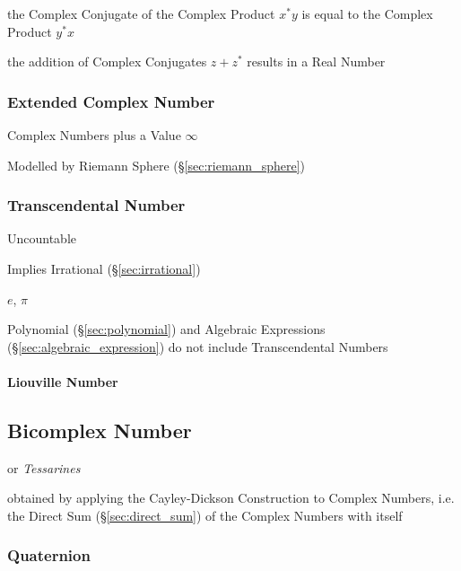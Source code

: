 the Complex Conjugate of the Complex Product $x^*y$ is equal to the Complex
Product $y^*x$

the addition of Complex Conjugates $z + z^*$ results in a Real Number



\subsubsection{Extended Complex Number}\label{sec:extended_complex}

Complex Numbers plus a Value $\infty$

Modelled by Riemann Sphere (\S\ref{sec:riemann_sphere})



\subsubsection{Transcendental Number}\label{sec:transcendental}

Uncountable

Implies Irrational (\S\ref{sec:irrational})

$e$, $\pi$

Polynomial (\S\ref{sec:polynomial}) and Algebraic Expressions
(\S\ref{sec:algebraic_expression}) do not include Transcendental Numbers



\paragraph{Liouville Number}\label{sec:liouville_number}\hfill



\subsection{Bicomplex Number}\label{sec:bicomplex_number}

or \emph{Tessarines}

obtained by applying the Cayley-Dickson Construction to Complex Numbers, i.e.
the Direct Sum (\S\ref{sec:direct_sum}) of the Complex Numbers with itself



\subsubsection{Quaternion}\label{sec:quaternion}

